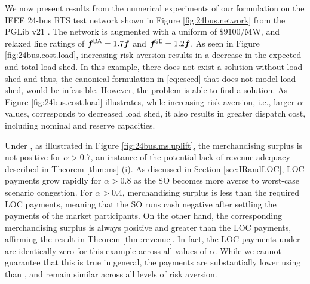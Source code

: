 We now present results from the numerical experiments of our \RSCED{} formulation on the IEEE 24-bus RTS test network shown in Figure \ref{fig:24bus.network} from the PGLib v21 \cite{pglib2021}. The network is augmented with a uniform \VoLL{} of $\$9100/$MW, and relaxed line ratings of ${\bm{f}}^{{\sf DA}} = 1.7 {\bm{f}}$ and ${\bm{f}}^{{\sf SE}} = 1.2 {\bm{f}}$.  As seen in Figure \ref{fig:24bus.cost.load}, increasing risk-aversion results in a decrease in the expected and total load shed. In this example, there does not exist a solution without load shed and thus, the canonical \CSCED{} formulation in \eqref{eq:csced} that does not model load shed, would be infeasible. However, the \RSCED{} problem is able to find a solution. As Figure \ref{fig:24bus.cost.load} illustrates, while increasing risk-aversion, i.e., larger $\alpha$ values, corresponds to decreased load shed, it also results in greater dispatch cost, including nominal and reserve capacities. 

Under \LMPnom{}, as illustrated in Figure \ref{fig:24bus.ms.uplift}, the merchandising surplus is not positive for $\alpha>0.7$, an instance of the potential lack of revenue adequacy described in Theorem \ref{thm:ms} (i). As discussed in Section \ref{sec:IRandLOC}, \LMPnom{} LOC payments grow rapidly for $\alpha>0.8$ as the SO becomes more averse to worst-case scenario congestion. For $\alpha>0.4$, merchandising surplus is less than the required LOC payments, meaning that the SO runs cash negative after settling the payments of the market participants. On the other hand, the corresponding \LMPmar{} merchandising surplus is always positive and greater than the LOC payments, affirming the result in Theorem \ref{thm:revenue}. 
In fact, the LOC payments under \LMPmar{} are identically zero for this example across all values of $\alpha$. While we cannot guarantee that this is true in general, the payments are substantially lower using \LMPmar{} than \LMPnom{}, and remain similar across all levels of risk aversion.

